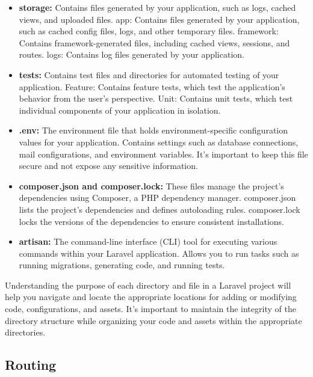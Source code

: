 \begin{itemize}
    \item \textbf{storage:}
        Contains files generated by your application, such as logs, cached views, and uploaded files.
        app: Contains files generated by your application, such as cached config files, logs, and other temporary files.
        framework: Contains framework-generated files, including cached views, sessions, and routes.
        logs: Contains log files generated by your application.

    \item \textbf{tests:}
        Contains test files and directories for automated testing of your application.
        Feature: Contains feature tests, which test the application's behavior from the user's perspective.
        Unit: Contains unit tests, which test individual components of your application in isolation.

    \item \textbf{.env:}
        The environment file that holds environment-specific configuration values for your application.
        Contains settings such as database connections, mail configurations, and environment variables.
        It's important to keep this file secure and not expose any sensitive information.

    \item \textbf{composer.json and composer.lock:}
        These files manage the project's dependencies using Composer, a PHP dependency manager.
        composer.json lists the project's dependencies and defines autoloading rules.
        composer.lock locks the versions of the dependencies to ensure consistent installations.

    \item \textbf{artisan:}
        The command-line interface (CLI) tool for executing various commands within your Laravel application.
        Allows you to run tasks such as running migrations, generating code, and running tests.
\end{itemize}
Understanding the purpose of each directory and file in a Laravel project will help you navigate and locate the appropriate locations for adding or modifying code, configurations, and assets. It's important to maintain the integrity of the directory structure while organizing your code and assets within the appropriate directories.
\subsection{Routing}

